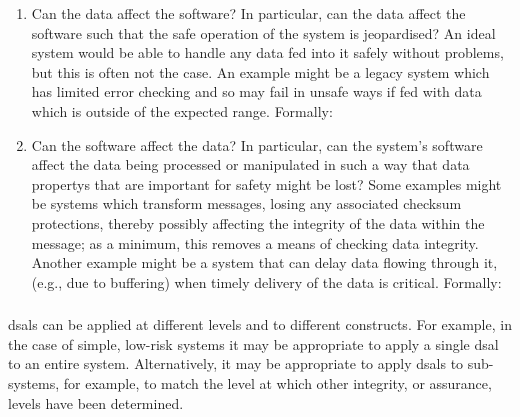 \begin{enumerate}
  \item Can the data affect the software? In particular, can the data affect the software such that the safe operation of the system is jeopardised? An ideal system would be able to handle any data fed into it safely without problems, but this is often not the case. An example might be a legacy system which has limited error checking and so may fail in unsafe ways if fed with data which is outside of the expected range. Formally: 
  \item Can the software affect the data? In particular, can the system's software affect the data being processed or manipulated in such a way that \glspl{data property} that are important for safety might be lost? Some examples might be systems which transform messages, losing any associated checksum protections, thereby possibly affecting the \gls{integrity} of the data within the message; as a minimum, this removes a means of checking data \gls{integrity}. Another example might be a system that can delay data flowing through it, (e.g., due to buffering) when timely delivery of the data is critical. Formally: 
\end{enumerate}

\subsubsection{}\label{bkm:activities:analyse:tailoring}
\glspl{dsal} can be applied at different levels and to different constructs. For example, in the case of simple, low-risk systems it may be appropriate to apply a single \gls{dsal} to an entire system. Alternatively, it may be appropriate to apply \glspl{dsal} to sub-systems, for example, to match the level at which other \gls{integrity}, or assurance, levels have been determined. 

